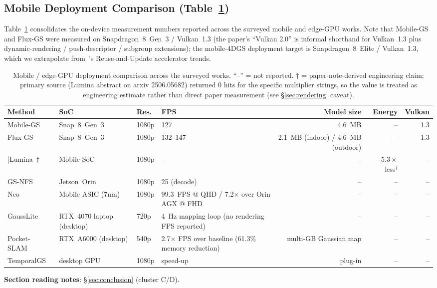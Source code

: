 
\subsection{Mobile Deployment Comparison (Table~\ref{tab:mobile})}
Table~\ref{tab:mobile} consolidates the on-device measurement
numbers reported across the surveyed mobile and edge-GPU works.
Note that Mobile-GS and Flux-GS were measured on
Snapdragon~8~Gen~3 / Vulkan~1.3 (the paper's ``Vulkan 2.0'' is
informal shorthand for Vulkan~1.3 plus dynamic-rendering /
push-descriptor / subgroup extensions); the mobile-4DGS deployment target is
Snapdragon~8~Elite / Vulkan~1.3, which we extrapolate
from~\cite{oh2025neo}'s Reuse-and-Update accelerator trends.
\begin{table}[t]
  \centering
\caption{Mobile / edge-GPU deployment comparison across the surveyed works. ``--'' = not reported. $\dagger$ = paper-note-derived engineering claim; primary source (Lumina abstract on arxiv 2506.05682) returned 0 hits for the specific multiplier strings, so the value is treated as engineering estimate rather than direct paper measurement (see \S\ref{sec:rendering} caveat).}
\label{tab:mobile}
\footnotesize
\setlength{\tabcolsep}{4pt}
\begin{tabular}{llllrrr}
\toprule
\textbf{Method} & \textbf{SoC} & \textbf{Res.} & \textbf{FPS} & \textbf{Model size} & \textbf{Energy} & \textbf{Vulkan} \\
\midrule
Mobile-GS~\cite{du2026mobilegs}       & Snap~8~Gen~3   & 1080p    & 127       & 4.6~MB         & --       & 1.3   \\
Flux-GS~\cite{du2026fluxgs}           & Snap~8~Gen~3   & 1080p    & 132--147       & 2.1~MB (indoor) / 4.6~MB (outdoor) & --      & 1.3   \\
|Lumina~\cite{feng2025lumina}$\dagger$ & Mobile SoC     & 1080p    & --        & --              & $5.3\times$ less$^{\dagger}$ & -- \\
GS-NFS~\cite{ghosh2026gsnfs}          & Jetson~Orin    & 1080p    & 25 (decode) & --            & --       & --    \\
Neo~\cite{oh2025neo}                  & Mobile ASIC (7nm) & 1080p & 99.3~FPS @ QHD / 7.2$\times$ over Orin AGX @ FHD & -- & -- & -- \\
GaussLite~\cite{thomas2026gausslite}  & RTX~4070 laptop (desktop) & 720p & 4~Hz mapping loop (no rendering FPS reported) & -- & -- & -- \\
Pocket-SLAM~\cite{li2026pocketslam}   & RTX~A6000 (desktop) & 540p & 2.7$\times$ FPS over baseline (61.3\% memory reduction) & multi-GB Gaussian map & -- & -- \\
TemporalGS~\cite{zhou2026temporalgs}  & desktop GPU    & 1080p    & speed-up    & plug-in       & --       & --    \\
\bottomrule
  \end{tabular}
\end{table}

\bigskip
\noindent\textbf{Section reading notes}:
\S\ref{sec:conclusion} (cluster C/D).
